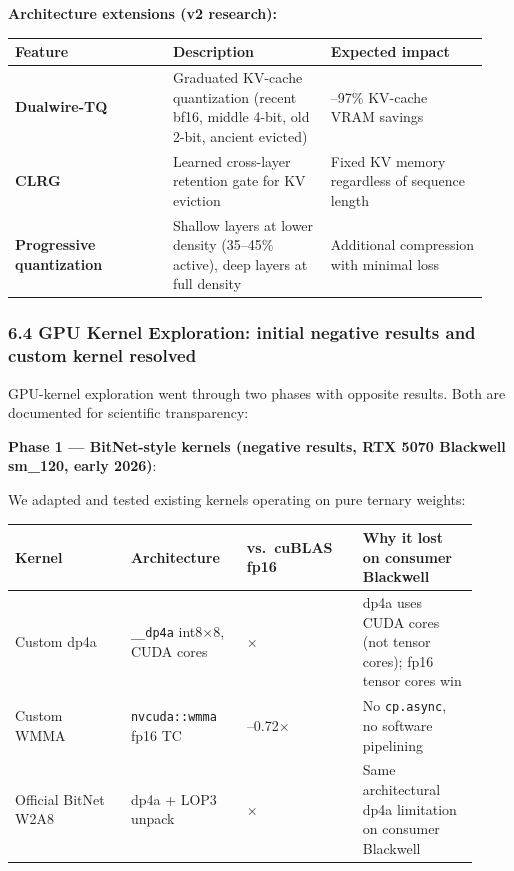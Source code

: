\textbf{Architecture extensions (v2 research):}

{\def\LTcaptype{none} %
{\footnotesize\setlength{\tabcolsep}{3pt}
\begin{longtable}[]{@{}>{\raggedright\arraybackslash}p{0.313\linewidth}>{\raggedright\arraybackslash}p{0.313\linewidth}>{\raggedright\arraybackslash}p{0.313\linewidth}@{}}
\toprule\noalign{}
Feature & Description & Expected impact \\
\midrule\noalign{}
\endhead
\bottomrule\noalign{}
\endlastfoot
\textbf{Dualwire-TQ} & Graduated KV-cache quantization (recent bf16,
middle 4-bit, old 2-bit, ancient evicted) & 85--97\% KV-cache VRAM
savings \\
\textbf{CLRG} & Learned cross-layer retention gate for KV eviction &
Fixed KV memory regardless of sequence length \\
\textbf{Progressive quantization} & Shallow layers at lower density
(35--45\% active), deep layers at full density & Additional compression
with minimal loss \\
\end{longtable}
}
}

\subsubsection{6.4 GPU Kernel Exploration: initial negative results and
custom kernel
resolved}\label{gpu-kernel-exploration-initial-negative-results-and-custom-kernel-resolved}

GPU-kernel exploration went through two phases with opposite results.
Both are documented for scientific transparency:

\textbf{Phase 1 --- BitNet-style kernels (negative results, RTX 5070
Blackwell sm\_120, early 2026)}:

We adapted and tested existing kernels operating on pure ternary
weights:

{\def\LTcaptype{none} %
{\footnotesize\setlength{\tabcolsep}{3pt}
\begin{longtable}[]{@{}>{\raggedright\arraybackslash}p{0.230\linewidth}>{\raggedright\arraybackslash}p{0.230\linewidth}>{\raggedright\arraybackslash}p{0.230\linewidth}>{\raggedright\arraybackslash}p{0.230\linewidth}@{}}
\toprule\noalign{}
Kernel & Architecture & vs.~cuBLAS fp16 & Why it lost on consumer Blackwell \\
\midrule\noalign{}
\endhead
\bottomrule\noalign{}
\endlastfoot
Custom dp4a & \texttt{\_\_dp4a} int8×8, CUDA cores & 0.24× & dp4a uses
CUDA cores (not tensor cores); fp16 tensor cores win \\
Custom WMMA & \texttt{nvcuda::wmma} fp16 TC & 0.15--0.72× & No
\texttt{cp.async}, no software pipelining \\
Official BitNet W2A8 & dp4a + LOP3 unpack & 0.24× & Same architectural
dp4a limitation on consumer Blackwell \\
\end{longtable}
}
}

